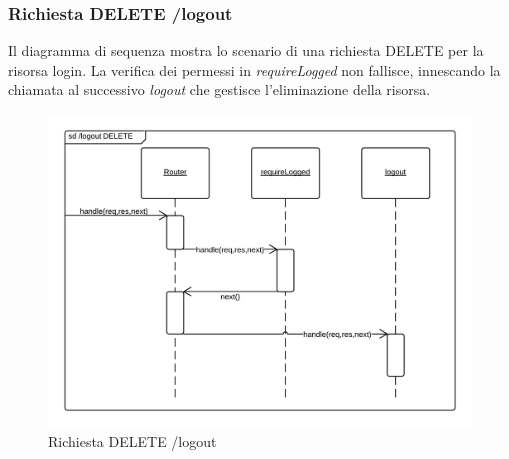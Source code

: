 \subsubsection{Richiesta DELETE /logout}
Il diagramma di sequenza mostra lo scenario di una richiesta DELETE per la risorsa login.
La verifica dei permessi in \emph{requireLogged} non fallisce, innescando la chiamata al successivo  \emph{logout} che gestisce l'eliminazione della risorsa.
\begin{figure}[H]
	\begin{center} 
		\includegraphics[scale=0.20]{scenari/logout DELETE.png} 
		\caption{Richiesta DELETE /logout}
	\end{center} 
\end{figure}

\pagebreak
